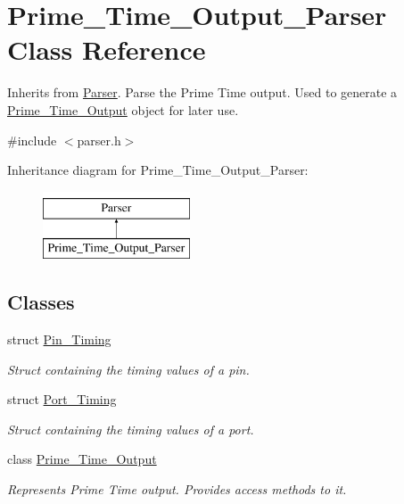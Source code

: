 \hypertarget{classPrime__Time__Output__Parser}{\section{Prime\-\_\-\-Time\-\_\-\-Output\-\_\-\-Parser Class Reference}
\label{classPrime__Time__Output__Parser}
}


Inherits from \hyperlink{classParser}{Parser}. Parse the Prime Time output. Used to generate a \hyperlink{classPrime__Time__Output__Parser_1_1Prime__Time__Output}{Prime\-\_\-\-Time\-\_\-\-Output} object for later use.  




{\ttfamily \#include $<$parser.\-h$>$}

Inheritance diagram for Prime\-\_\-\-Time\-\_\-\-Output\-\_\-\-Parser\-:\begin{figure}[H]
\begin{center}
\leavevmode
\includegraphics[height=2.000000cm]{classPrime__Time__Output__Parser}
\end{center}
\end{figure}
\subsection*{Classes}
\begin{DoxyCompactItemize}
\item 
struct \hyperlink{structPrime__Time__Output__Parser_1_1Pin__Timing}{Pin\-\_\-\-Timing}
\begin{DoxyCompactList}\small\item\em Struct containing the timing values of a pin. \end{DoxyCompactList}\item 
struct \hyperlink{structPrime__Time__Output__Parser_1_1Port__Timing}{Port\-\_\-\-Timing}
\begin{DoxyCompactList}\small\item\em Struct containing the timing values of a port. \end{DoxyCompactList}\item 
class \hyperlink{classPrime__Time__Output__Parser_1_1Prime__Time__Output}{Prime\-\_\-\-Time\-\_\-\-Output}
\begin{DoxyCompactList}\small\item\em Represents Prime Time output. Provides access methods to it. \end{DoxyCompactList}\end{DoxyCompactItemize}
